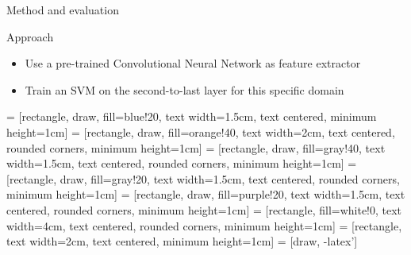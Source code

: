 \documentclass{beamer}
\begin{document}
    \begin{frame}{Method and evaluation}
        \begin{block}{Approach}
            \begin{itemize}
            \item Use a pre-trained Convolutional Neural Network as feature extractor
            \item Train an SVM on the second-to-last layer for this specific domain
            \end{itemize}
        \end{block}
        \begin{block}{}
 = [rectangle, draw, fill=blue!20, 
    text width=1.5cm, text centered, minimum height=1cm]
 = [rectangle, draw, fill=orange!40,
    text width=2cm, text centered, rounded corners, minimum height=1cm]
 = [rectangle, draw, fill=gray!40, 
    text width=1.5cm, text centered, rounded corners, minimum height=1cm]
 = [rectangle, draw, fill=gray!20, 
    text width=1.5cm, text centered, rounded corners, minimum height=1cm]
 = [rectangle, draw, fill=purple!20, 
    text width=1.5cm, text centered, rounded corners, minimum height=1cm]
 = [rectangle, fill=white!0,
    text width=4cm, text centered, rounded corners, minimum height=1cm]
 = [rectangle, text width=2cm, 
    text centered, minimum height=1cm]
 = [draw, -latex']
        \end{block}
    \end{frame}
\end{document}
